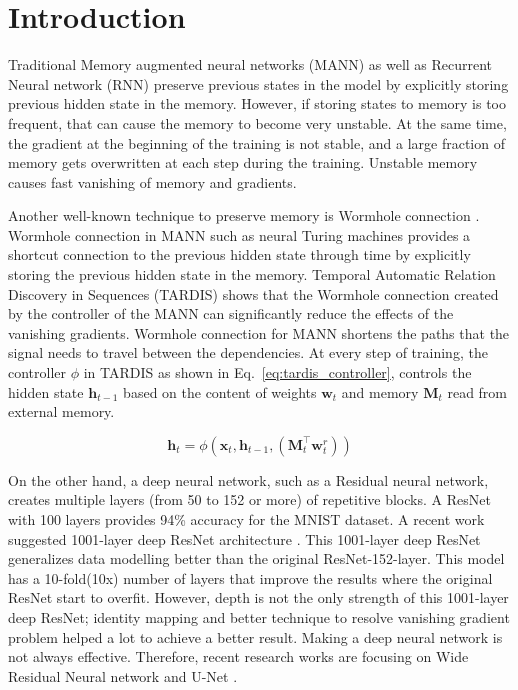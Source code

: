 \documentclass{article}
\begin{document}
\section{Introduction}
\label{sec:ch9-intro}

Traditional Memory augmented neural networks (MANN) \cite{santoro2016one} as well as Recurrent Neural network (RNN) preserve previous states in the model by explicitly storing previous hidden state in the memory. However, if storing states to memory is too frequent, that can cause the memory to become very unstable. At the same time, the gradient at the beginning of the training is not stable, and a large fraction of memory gets overwritten at each step during the training. Unstable memory causes fast vanishing of memory and gradients.

Another well-known technique to preserve memory is Wormhole connection \cite{gulcehre2017memory}.  Wormhole connection in MANN such as neural Turing machines \cite{ntm} provides a shortcut connection to the previous hidden state through time by explicitly storing the previous hidden state in the memory. Temporal Automatic Relation Discovery in Sequences (TARDIS) \cite{gulcehre2017memory} shows that the Wormhole connection created by the controller of the MANN can significantly reduce the effects of the vanishing gradients. Wormhole connection for MANN shortens the paths that the signal needs to travel between the dependencies. At every step of training, the controller $\phi$ in TARDIS as shown in Eq.~\eqref{eq:tardis_controller}, controls the hidden state $\mathbf{h}_{t-1}$ based on the content of weights $\mathbf{w}_{t}$ and memory $\mathbf{M}_{t}$ read from external memory.

\begin{equation}
\mathbf{h}_{t}=\phi(\mathbf{x}_{t}, \mathbf{h}_{t-1},( \mathbf{M}_{t}^{\top} \mathbf{w}_{t}^{r}))
\label{eq:tardis_controller}
\end{equation}



On the other hand, a deep neural network, such as a Residual neural network, creates multiple layers (from 50 to 152 or more) of repetitive blocks. A ResNet with 100 layers provides 94\% accuracy for the MNIST dataset. A recent work suggested 1001-layer deep ResNet architecture \cite{he2016identity}. This 1001-layer deep ResNet generalizes data modelling better than the original ResNet-152-layer. This model has a 10-fold(10x) number of layers that improve the results where the original ResNet start to overfit. However, depth is not the only strength of this 1001-layer deep ResNet; identity mapping and better technique to resolve vanishing gradient problem helped a lot to achieve a better result.  Making a deep neural network is not always effective. Therefore, recent research works are focusing on Wide Residual Neural network \cite{he2016identity} and U-Net \cite{ronneberger2015u}. 
\end{document}

